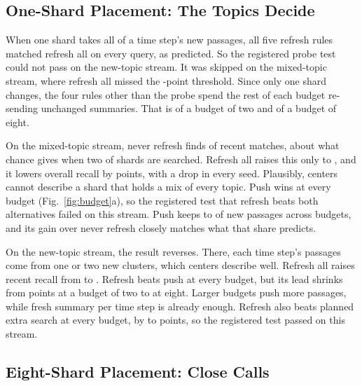 \subsection{One-Shard Placement: The Topics Decide}
\label{sec:res-one}

When one shard takes all of a time step's new passages, all five refresh rules matched refresh all on every query, as predicted.
So the registered probe test could not pass on the new-topic stream.
It was skipped on the mixed-topic stream, where refresh all missed the \RNumPlainGateThreshold{}-point threshold.
Since only one shard changes, the four rules other than the probe spend the rest of each budget re-sending unchanged summaries.
That is \RNumMTwoUnmodShareBTwo{} of a budget of two and \RNumMTwoUnmodShareBEight{} of a budget of eight.

On the mixed-topic stream, never refresh finds \RNumPlainLvlMTwoNRSteady{} of recent matches, about what chance gives when two of \RNumNumShards{} shards are searched.
Refresh all raises this only to \RNumPlainLvlMTwoAFSteady{}, and it lowers overall recall by \RNumPlainGateMTwoOverallSteady{} points, with a drop in every seed.
Plausibly, \RNumCentersPerSummary{} centers cannot describe a shard that holds a mix of every topic.
Push wins at every budget (Fig.~\ref{fig:budget}a), so the registered test that refresh beats both alternatives failed on this stream.
Push keeps \RNumMTwoPVShareBTwo{} to \RNumMTwoPVShareBEight{} of new passages across budgets, and its gain over never refresh closely matches what that share predicts.

On the new-topic stream, the result reverses.
There, each time step's passages come from one or two new clusters, which \RNumCentersPerSummary{} centers describe well.
Refresh all raises recent recall from \RNumPlainLvlMTwoNRNewTopic{} to \RNumPlainLvlMTwoAFNewTopic{}.
Refresh beats push at every budget, but its lead shrinks from \RNumPlainHFourPVBTwoNewTopic{} points at a budget of two to \RNumPlainHFourPVBEightNewTopic{} at eight.
Larger budgets push more passages, while \RNumOneSummary{} fresh summary per time step is already enough.
Refresh also beats planned extra search at every budget, by \RNumPlainHFourESMinNewTopic{} to \RNumPlainHFourESMaxNewTopic{} points, so the registered test passed on this stream.

\subsection{Eight-Shard Placement: Close Calls}
\label{sec:res-eight}


